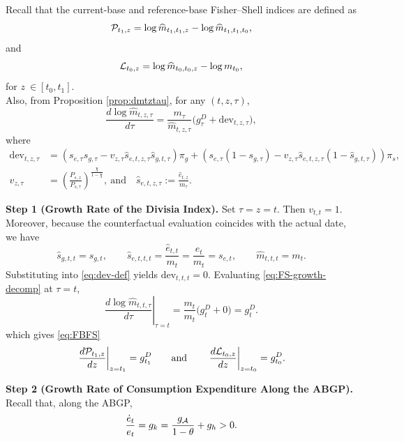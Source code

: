 \documentclass[12pt,a4paper]{article}
\def\equiv{:=}  %
\begin{document}
\begin{appendices}
Recall that the current-base and reference-base Fisher--Shell indices are defined as
\[{\cal P}_{t_{1},z}=\log\widehat{m}_{t_{1},t_{1},z}-\log\widehat{m}_{t_{1},t_{1},t_{0}},\]
and
\[{\cal L}_{t_{0},z}=\log\widehat{m}_{t_{0},t_{0},z}-\log m_{t_{0}},
\]
for $z \ \in [t_{0},t_{1}]$.\\
Also, from Proposition \ref{prop:dmtztau}, for any \((t,z,\tau)\),
\begin{equation}\label{eq:FS-growth-decomp}
\frac{d\log \widehat m_{t,z,\tau}}{d\tau}
=
\frac{m_\tau}{\widehat m_{t,z,\tau}}
\Big(g_\tau^D+\mathrm{dev}_{t,z,\tau}\Big),
\end{equation}
where
\begin{align}\label{eq:dev-def}
\mathrm{dev}_{t,z,\tau}
&=
\left(s_{e,\tau}s_{g,\tau}
-
v_{z,\tau}\widehat s_{e,t,z,\tau}\widehat s_{g,t,\tau}\right)\pi_g
+
\left(s_{e,\tau}(1-s_{g,\tau})
-
v_{z,\tau}\widehat s_{e,t,z,\tau}(1-\widehat s_{g,t,\tau})\right)\pi_s,
\\
v_{z,\tau}&=\left(\frac{P_{s,z}}{P_{s,\tau}}\right)^{\frac{\chi}{1-\chi}},
\ \text{and} \quad
\widehat s_{e,t,z,\tau}\equiv\frac{\widehat e_{t,z}}{m_\tau}.
\nonumber
\end{align}

\medskip
\noindent\textbf{Step 1 (Growth Rate of the Divisia Index).}
Set \(\tau=z=t\). Then \(v_{t,t}=1\). Moreover, because the counterfactual evaluation coincides with the actual date, we have
\[
\widehat s_{g,t,t}=s_{g,t},
\qquad
\widehat s_{e,t,t,t}=\frac{\widehat e_{t,t}}{m_t}=\frac{e_t}{m_t}=s_{e,t},
\qquad
\widehat m_{t,t,t}=m_t.
\]
Substituting into \eqref{eq:dev-def} yields \(\mathrm{dev}_{t,t,t}=0\). Evaluating \eqref{eq:FS-growth-decomp} at \(\tau=t\),
\[
\left.\frac{d\log \widehat m_{t,t,\tau}}{d\tau}\right|_{\tau=t}
=
\frac{m_t}{m_t}\big(g_t^D+0\big)=g_t^D.
\]
which gives \eqref{eq:FBFS}
$$\left.\frac{d{\cal P}_{t_{1},z}}{dz}\right|_{z=t_{1}}=g_{t_{1}}^{D}\qquad\text{and}\qquad\left.\frac{d{\cal L}_{t_{0},z}}{dz}\right|_{z=t_{0}}=g_{t_{0}}^{D}.$$ 

\medskip
\noindent\textbf{Step 2 (Growth Rate of Consumption Expenditure Along the ABGP).}
Recall that, along the ABGP, 
$$\frac{\dot e_t}{e_t}=g_k= \frac{g_{\cal{A}}}{1-\theta} + g_{h}>0.$$


\end{appendices}
\end{document}
